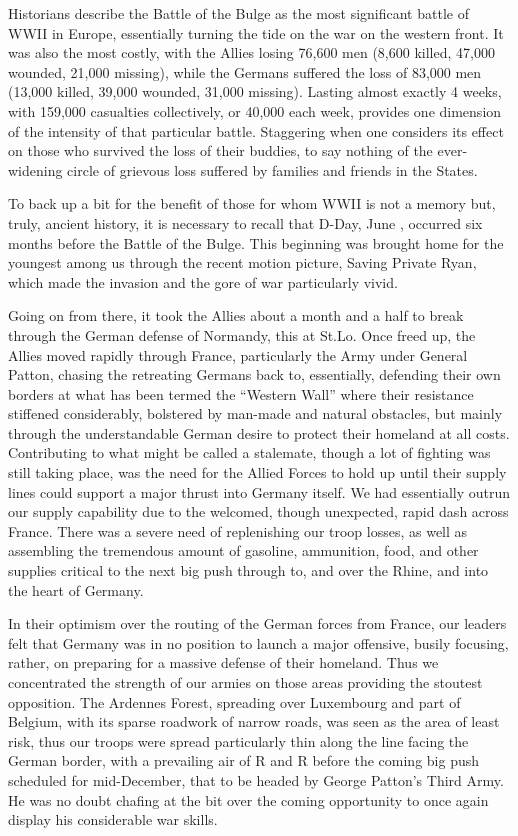 \documentclass[../m3y]{subfiles}
\begin{document}
Historians describe the Battle of the Bulge as the most significant battle of WW\thinspace{}II in Europe, essentially turning the tide on the war on the western front. It was also the most costly, with the Allies losing 76,600 men (8,600 killed, 47,000 wounded, 21,000 missing), while the Germans suffered the loss of 83,000 men (13,000 killed, 39,000 wounded, 31,000 missing). Lasting almost exactly 4 weeks, with 159,000 casualties collectively, or 40,000 each week, provides one dimension of the intensity of that particular battle. Staggering when one considers its effect on those who survived the loss of their buddies, to say nothing of the ever-widening circle of grievous loss suffered by families and friends in the States.

To back up a bit for the benefit of those for whom WW\thinspace{}II is not a memory but, truly, ancient history, it is necessary to recall that D-Day, June , occurred six months before the Battle of the Bulge. This beginning was brought home for the youngest among us through the recent motion picture, Saving Private Ryan, which made the invasion and the gore of war particularly vivid.

Going on from there, it took the Allies about a month and a half to break through the German defense of Normandy, this at St.\@ Lo. Once freed up, the Allies moved rapidly through France, particularly the  Army under General Patton, chasing the retreating Germans back to, essentially, defending their own borders at what has been termed the ``Western Wall'' where their resistance stiffened considerably, bolstered by man-made and natural obstacles, but mainly through the understandable German desire to protect their homeland at all costs. Contributing to what might be called a stalemate, though a lot of fighting was still taking place, was the need for the Allied Forces to hold up until their supply lines could support a major thrust into Germany itself. We had essentially outrun our supply capability due to the welcomed, though unexpected, rapid dash across France. There was a severe need of replenishing our troop losses, as well as assembling the tremendous amount of gasoline, ammunition, food, and other supplies critical to the next big push through to, and over the Rhine, and into the heart of Germany.

In their optimism over the routing of the German forces from France, our leaders felt that Germany was in no position to launch a major offensive, busily focusing, rather, on preparing for a massive defense of their homeland. Thus we concentrated the strength of our armies on those areas providing the stoutest opposition. The Ardennes Forest, spreading over Luxembourg and part of Belgium, with its sparse roadwork of narrow roads, was seen as the area of least risk, thus our troops were spread particularly thin along the line facing the German border, with a prevailing air of R and R before the coming big push scheduled for mid-December, that to be headed by George Patton's Third Army. He was no doubt chafing at the bit over the coming opportunity to once again display his considerable war skills.
\end{document}
